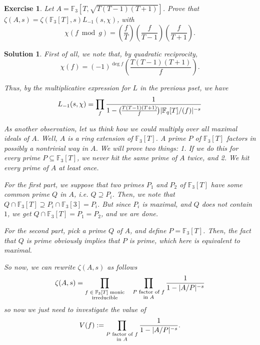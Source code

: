 \documentclass{article}
\newtheorem{ex}{Exercise}
\theoremstyle{nonumberplain}
\newtheorem{sol}{Solution}
\newcommand{\FF}{\mathbb{F}}
\DeclarePairedDelimiter{\abs}{\lvert}{\rvert}
\newcommand{\legendre}[2]{\genfrac{(}{)}{}{}{#1}{#2}}
\begin{document}
\begin{ex}
Let $A = \FF_3[T, \sqrt{T(T-1)(T+1)}]$. Prove that $\zeta(A,s) = \zeta(\FF_3[T],s) L_{-1}(s,\chi)$, with
\begin{equation}
\chi(f \bmod g) = \legendre f T \legendre f {T-1} \legendre f {T+1}.
\end{equation}
\end{ex}

\begin{sol}
First of all, we note that, by quadratic reciprocity,
\begin{equation}
\chi(f) = (-1)^{\deg f} \legendre{T(T-1)(T+1)}f.
\end{equation}

Thus, by the multiplicative expression for $L$ in the previous pset, we have
\begin{equation}
L_{-1}(s,\chi) = \prod_f \frac1{1 - \legendre{T(T-1)(T+1)}f \abs{\FF_q[T]/(f)}^{-s}}
\end{equation}

As another observation, let us think how we could multiply over all maximal ideals of $A$. Well, $A$ is a ring extension of $\FF_3[T]$. A prime $P$ of $\FF_3[T]$ factors in possibly a nontrivial way in $A$. We will prove two things: 1. If we do this for every prime $P \subseteq \FF_3[T]$, we never hit the same prime of $A$ twice, and 2. We hit every prime of $A$ at least once.

For the first part, we suppose that two primes $P_1$ and $P_2$ of $\FF_3[T]$ have some common prime $Q$ in $A$, i.e. $Q \supseteq P_i$. Then, we note that $Q \cap \FF_3[T] \supseteq P_i \cap \FF_3[3] = P_i$. But since $P_i$ is maximal, and $Q$ does not contain $1$, we get $Q \cap \FF_3[T] = P_1 = P_2$, and we are done.

For the second part, pick a prime $Q$ of $A$, and define $P = \FF_3[T]$. Then, the fact that $Q$ is prime obviously implies that $P$ is prime, which here is equivalent to maximal.

So now, we can rewrite $\zeta(A,s)$ as follows
\begin{equation}
\zeta(A,s) = \prod_{\substack{\text{$f \in \FF_3[T]$ monic}\\\text{irreducible}}} \quad \prod_{\substack{\text{$P$ factor of $f$}\\\text{in $A$}}} \frac1{1-\abs{A/P}^{-s}}
\end{equation}
so now we just need to investigate the value of
\begin{equation}
V(f) := \prod_{\substack{\text{$P$ factor of $f$}\\\text{in $A$}}} \frac1{1-\abs{A/P}^{-s}}.
\end{equation}


\end{sol}
\end{document}
